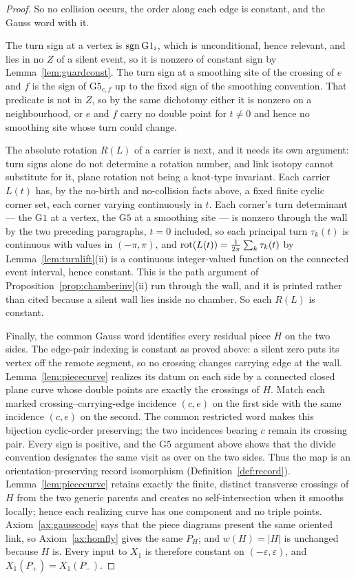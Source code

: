 \begin{proof}
So no collision occurs, the order along each edge is constant, and the Gauss
word with it.

The turn sign at a vertex is $\operatorname{sgn}\mathrm{G1}_i$, which is unconditional,
hence relevant, and lies in no $Z$ of a silent event, so it is nonzero of
constant sign by Lemma~\ref{lem:guardconst}. The
turn sign at a smoothing site of the crossing of $e$ and $f$ is the sign of
$\mathrm{G5}_{e,f}$ up to the fixed sign of the smoothing convention. That
predicate is not in $Z$, so by the same dichotomy either it is nonzero on a
neighbourhood, or $e$ and $f$ carry no double point for $t\neq0$ and hence no
smoothing site whose turn could change.

The absolute rotation $R(L)$ of a carrier is next, and it needs its own
argument: turn signs alone do not determine a rotation number, and link
isotopy cannot substitute for it, plane rotation not being a knot-type
invariant. Each carrier $L(t)$ has, by the no-birth and no-collision facts
above, a fixed finite cyclic corner set, each corner varying continuously in
$t$. Each corner's turn determinant --- the $\mathrm{G1}$ at a vertex, the
$\mathrm{G5}$ at a smoothing site --- is nonzero through the wall by the two
preceding paragraphs, $t=0$ included, so each principal turn $\tau_k(t)$ is
continuous with values in $(-\pi,\pi)$, and
$\operatorname{rot}(L(t))=\frac1{2\pi}\sum_k\tau_k(t)$ by Lemma~\ref{lem:turnlift}(ii) is a
continuous integer-valued function on the connected event interval, hence
constant. This is the path argument of Proposition~\ref{prop:chamberinv}(ii) run
through the wall, and it is printed rather than cited because a silent wall
lies inside no chamber. So each $R(L)$ is constant.

Finally, the common Gauss word identifies every residual piece $H$ on the two
sides. The edge-pair indexing is constant as proved above: a silent zero puts its vertex
off the remote segment, so no crossing changes carrying edge at the wall.
Lemma~\ref{lem:piececurve} realizes its datum on each side by a connected
closed plane curve whose double points are exactly the crossings of $H$. Match each marked crossing--carrying-edge
incidence $(c,e)$ on the first side with the same incidence $(c,e)$
on the second. The common restricted word makes this bijection cyclic-order
preserving; the two incidences bearing $c$ remain its crossing pair. Every sign
is positive, and the $\mathrm{G5}$ argument above shows that the divide
convention designates the same visit as over on the two sides. Thus the map is
an orientation-preserving record isomorphism
(Definition~\ref{def:record}). Lemma~\ref{lem:piececurve} retains exactly
the finite, distinct transverse crossings of $H$ from the two generic parents
and creates no self-intersection when it smooths locally; hence each realizing
curve has one component and no triple points. Axiom~\ref{ax:gausscode} says that the piece diagrams present the same
oriented link, so Axiom~\ref{ax:homfly} gives the same $P_H$; and
$w(H)=|H|$ is unchanged because $H$ is.
Every input to $X_1$ is therefore constant on $(-\varepsilon,\varepsilon)$, and
$X_1(P_+)=X_1(P_-)$.
\end{proof}

